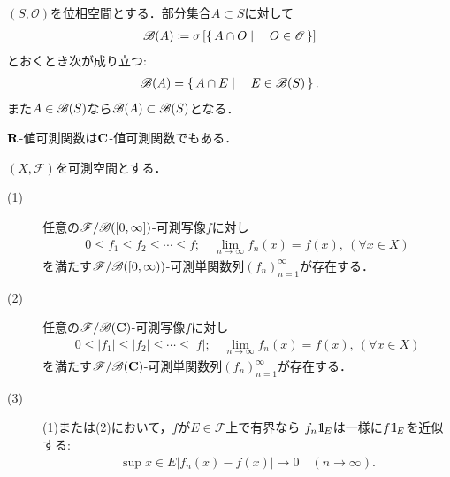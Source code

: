 	\begin{screen}
		\begin{thm}[相対位相のBorel集合族]\label{thm:Borel_algebra_of_relative_topology}
			$(S,\mathscr{O})$を位相空間とする．部分集合$A \subset S$に対して
			\begin{align}
				\mathscr{B}(A) \coloneqq \sigma\left[ \left\{\, A \cap O \mid \quad O \in \mathscr{O}\, \right\} \right]
			\end{align}
			とおくとき次が成り立つ:
			\begin{align}
				\mathscr{B}(A) = \left\{\, A \cap E \mid \quad E \in \mathscr{B}(S)\, \right\}.
			\end{align}
			また$A \in \mathscr{B}(S)$なら$\mathscr{B}(A) \subset \mathscr{B}(S)$となる．
		\end{thm}
	\end{screen}
	
	$\mathbf{R}$-値可測関数は$\mathbf{C}$-値可測関数でもある．
	
	\begin{screen}
		\begin{thm}[単関数近似列の存在]
			$(X,\mathscr{F})$を可測空間とする．
			\begin{description} 
				\item[(1)] 任意の$\mathscr{F}/\mathscr{B}([0,\infty])$-可測写像$f$に対し
					\begin{align}
						0 \leq f_1 \leq f_2 \leq \cdots \leq f;
						\quad \lim_{n \to \infty} f_n(x) = f(x),\ (\forall x \in X)
					\end{align}
					を満たす$\mathscr{F}/\mathscr{B}([0,\infty))$-可測単関数列$(f_n)_{n=1}^\infty$が存在する．
					
				\item[(2)]
					 任意の$\mathscr{F}/\mathscr{B}(\mathbf{C})$-可測写像$f$に対し
					\begin{align}
						0 \leq |f_1| \leq |f_2| \leq \cdots \leq |f|;
						\quad \lim_{n \to \infty} f_n(x) = f(x),\ (\forall x \in X)
					\end{align}
					を満たす$\mathscr{F}/\mathscr{B}(\mathbf{C})$-可測単関数列$(f_n)_{n=1}^\infty$が存在する．
				
				\item[(3)] (1)または(2)において，$f$が$E \in \mathscr{F}$上で有界なら
					$f_n \mbox{1}\hspace{-0.25em}\mbox{l}_E$は一様に$f \mbox{1}\hspace{-0.25em}\mbox{l}_E$を近似する:
					\begin{align}
						\sup{x \in E}{\left| f_n(x) - f(x) \right|} \longrightarrow 0
						\quad (n \longrightarrow \infty).
					\end{align}
			\end{description}
		\end{thm}
	\end{screen}
	
